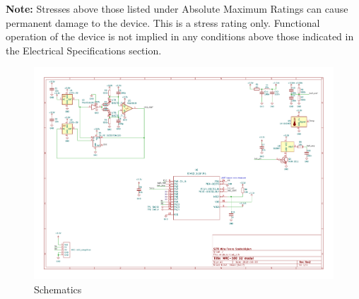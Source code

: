 \documentclass[10pt]{datasheet}
\begin{document}
\textbf{Note:} Stresses above those listed under Absolute Maximum Ratings can
cause permanent damage to the device. This is a stress rating only. Functional
operation of the device is not implied in any conditions above those indicated
in the Electrical Specifications section.

\begin{figure}
	\centering
	\includegraphics[width=\textwidth]{sch}
	\caption{Schematics}
\end{figure}
\end{document}
